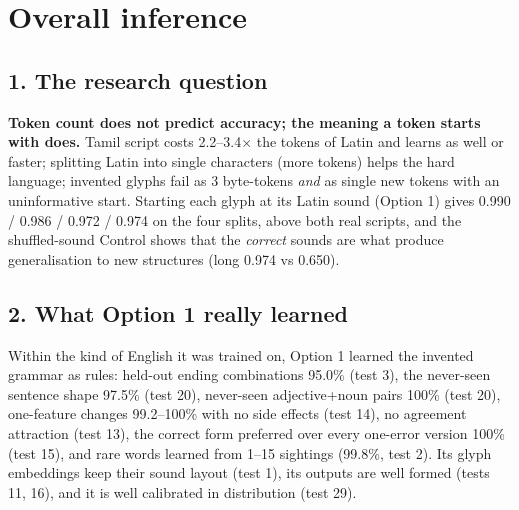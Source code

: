 \documentclass[10pt,a4paper,oneside]{article}
\begin{document}
\section{Overall inference}

\subsection*{1. The research question}
\textbf{Token count does not predict accuracy; the meaning a token starts with does.} Tamil script costs 2.2--3.4$\times$
the tokens of Latin and learns as well or faster; splitting Latin into single characters (more tokens) helps the hard
language; invented glyphs fail as 3 byte-tokens \emph{and} as single new tokens with an uninformative start. Starting
each glyph at its Latin sound (Option 1) gives 0.990 / 0.986 / 0.972 / 0.974 on the four splits, above both real
scripts, and the shuffled-sound Control shows that the \emph{correct} sounds are what produce generalisation to new
structures (long 0.974 vs 0.650).

\subsection*{2. What Option 1 really learned}
Within the kind of English it was trained on, Option 1 learned the invented grammar as rules: held-out ending
combinations 95.0\% (test 3), the never-seen sentence shape 97.5\% (test 20), never-seen adjective+noun pairs 100\%
(test 20), one-feature changes 99.2--100\% with no side effects (test 14), no agreement attraction (test 13), the
correct form preferred over every one-error version 100\% (test 15), and rare words learned from 1--15 sightings
(99.8\%, test 2). Its glyph embeddings keep their sound layout (test 1), its outputs are well formed (tests 11, 16),
and it is well calibrated in distribution (test 29).
\end{document}
